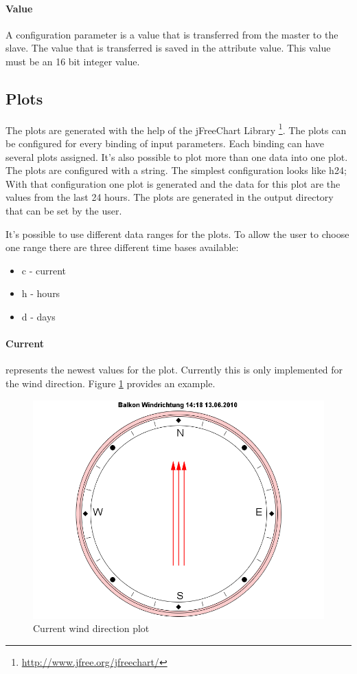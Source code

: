 \paragraph{Value} %
\label{par:value}
A configuration parameter is a value that is transferred from the master to the slave. The value that is transferred is saved in the attribute value. This value must be an 16 bit integer value.


\subsection{Plots} %
\label{sub:plots}
The plots are generated with the help of the jFreeChart Library \footnote{\url{http://www.jfree.org/jfreechart/}}.
The plots can be configured for every binding of input parameters. Each binding can have several plots assigned. It's also possible to plot more than one data into one plot. The plots are configured with a string. The simplest configuration looks like {\C h24;} With that configuration one plot is generated and the data for this plot are the values from the last 24 hours. The plots are generated in the output directory that can be set by the user.

It's possible to use different data ranges for the plots. To allow the user to choose one range there are three different time bases available:
\begin{itemize}
	\item c - current
	\item h - hours
	\item d - days
\end{itemize}

\paragraph{Current} %
\label{par:current}
represents the newest values for the plot. Currently this is only implemented for the wind direction. Figure \ref{fig:current} provides an example.
\begin{figure}[ht]
    \centering
    \includegraphics[width=0.9\linewidth]{master/plot_examplec.png}
    \caption{Current wind direction plot}
    \label{fig:current}
\end{figure}

